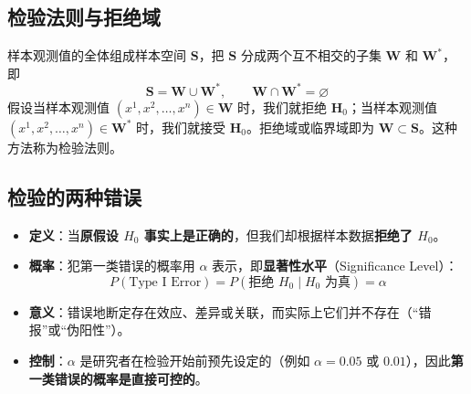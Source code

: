 \subsection{检验法则与拒绝域}
\begin{definition}[检验法则与拒绝域]
样本观测值的全体组成样本空间 $\boldsymbol{S}$，把 $\boldsymbol{S}$ 分成两个互不相交的子集 $\boldsymbol{W}$ 和 $\boldsymbol{W}^*$，即
\begin{equation}
	\boldsymbol{S}=\boldsymbol{W}\cup \boldsymbol{W}^*, \qquad \boldsymbol{W}\cap \boldsymbol{W}^*=\varnothing
	\label{eq:假设检验:样本空间分割}
\end{equation}
假设当样本观测值 $(x^1,x^2,\dots,x^n)\in \boldsymbol{W}$ 时，我们就拒绝 $\boldsymbol{H}_0$；当样本观测值 $(x^1,x^2,\dots,x^n)\in \boldsymbol{W}^*$ 时，我们就接受 $\boldsymbol{H}_0$。拒绝域或临界域即为 $\boldsymbol{W}\subset \boldsymbol{S}$。这种方法称为检验法则。
\end{definition}

\subsection{检验的两种错误}
\begin{definition}
\begin{itemize}
	\item \textbf{定义}：当\textbf{原假设 $H_0$ 事实上是正确的}，但我们却根据样本数据\textbf{拒绝了 $H_0$}。
	\item \textbf{概率}：犯第一类错误的概率用 $\alpha$ 表示，即\textbf{显著性水平}（Significance Level）：
	\begin{equation}
		P(\text{Type I Error}) = P(\text{拒绝 } H_0 \mid H_0 \text{ 为真}) = \alpha
		\label{eq:假设检验:第一类错误}
	\end{equation}
	\item \textbf{意义}：错误地断定存在效应、差异或关联，而实际上它们并不存在（“错报”或“伪阳性”）。
	\item \textbf{控制}：$\alpha$ 是研究者在检验开始前预先设定的（例如 $\alpha = 0.05$ 或 $0.01$），因此\textbf{第一类错误的概率是直接可控的}。
\end{itemize}
\end{definition}

